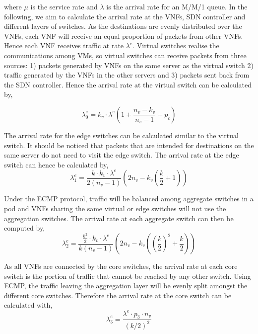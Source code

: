 where $\mu$ is the service rate and $\lambda$ is the arrival rate for an M/M/1 queue. In the following, we aim to calculate the arrival rate at the VNFs, SDN controller and different layers of switches. As the destinations are evenly distributed over the VNFs, each VNF will receive an equal proportion of packets from other VNFs. Hence each VNF receives traffic at rate $\lambda^e$. Virtual switches realise the communications among VMs, so virtual switches can receive packets from three sources: 1) packets generated by VNFs on the same server as the virtual switch 2) traffic generated by the VNFs in the other servers and 3) packets sent back from the SDN controller. Hence the arrival rate at the virtual switch can be calculated by,

\begin{equation}
    \label{eq:arr_srv}
    \lambda_0^e = k_v \cdot \lambda^e \left(1+\frac{n_v - k_v}{n_v - 1} + p_c \right)
\end{equation}

The arrival rate for the edge switches can be calculated similar to the virtual switch. It should be noticed that packets that are intended for destinations on the same server do not need to visit the edge switch. The arrival rate at the edge switch can hence be calculated by,
\begin{equation}
    \label{eq:arr_edge}
    \lambda_1^e = \frac{k \cdot k_v \cdot \lambda^e}{2(n_v - 1)}\left(2n_v - k_v \left(\frac{k}{2} + 1 \right)\right)
\end{equation}

Under the ECMP protocol, traffic will be balanced among aggregate switches in a pod and VNFs sharing the same virtual or edge switches will not use the aggregation switches. The arrival rate at each aggregate switch can then be computed by,
\begin{equation}
    \label{eq:arr_agg}
    \lambda_2^e = \frac{\frac{k^2}{2} \cdot k_v \cdot \lambda^e}{k(n_v - 1)}\left(2n_v - k_v \left(\left(\frac{k}{2}\right)^2 + \frac{k}{2} \right)\right)
\end{equation}

As all VNFs are connected by the core switches, the arrival rate at each core switch is the portion of traffic that cannot be reached by any other switch. Using ECMP, the traffic leaving the aggregation layer will be evenly split amongst the different core switches. Therefore the arrival rate at the core switch can be calculated with,
\begin{equation}
    \label{eq:arr_core}
    \lambda_3^e =\frac{\lambda^e \cdot p_3 \cdot n_v}{(k/2)^2}
\end{equation}

